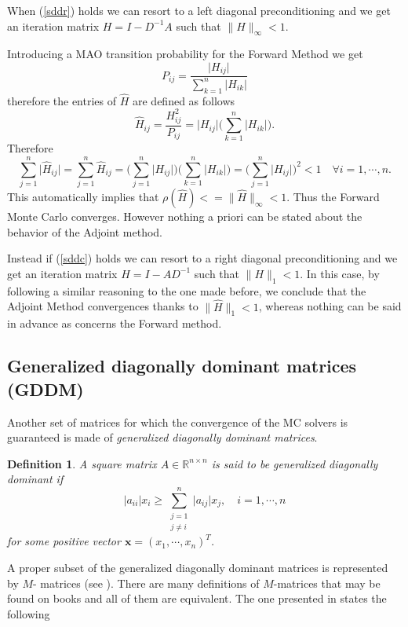 \documentclass[a4paper,10pt]{article}
\newtheorem{defn}{Definition}
\begin{document}
When (\ref{sddr}) holds we can resort to a left diagonal preconditioning and we 
get an iteration matrix $H=I-D^{-1}A$ such that $\lVert H \rVert_{\infty}<1$.

Introducing a MAO transition probability for the Forward Method we get
\[
 P_{ij}=\frac{\lvert H_{ij}\rvert}{\sum_{k=1}^n\lvert H_{ik}\rvert}
\]
therefore the entries of $\hat{H}$ are defined as follows
\[
 \hat{H}_{ij}=\frac{H^2_{ij}}{P_{ij}}=\lvert H_{ij}\rvert\bigg 
(\sum_{k=1}^n\lvert 
H_{ik}\rvert\bigg ).
\]
Therefore
\[
 \sum_{j=1}^n\lvert \hat{H}_{ij} \rvert = \sum_{j=1}^n \hat{H}_{ij} =\bigg 
(\sum_{j=1}^n \lvert H_{ij}\rvert\bigg )\bigg (\sum_{k=1}^n\lvert 
H_{ik}\rvert\bigg ) =\bigg 
(\sum_{j=1}^n \lvert H_{ij}\rvert\bigg ) ^2 <1 \quad \forall i=1,\cdots, n.
\]
This automatically implies that $\rho(\hat{H})<=\lVert 
\hat{H}\rVert_{\infty}<1$. Thus the Forward Monte Carlo converges.
However nothing a priori can be 
stated about the behavior of the Adjoint method.\newline

Instead if (\ref{sddc}) holds we can resort to a right diagonal preconditioning 
and we 
get an iteration matrix $H=I-AD^{-1}$ such that $\lVert H \rVert_{1}<1$.
In this case, by following a similar reasoning to the one made before, we 
conclude that the Adjoint Method convergences thanks to $\lVert 
\hat{H}\rVert_1<1$, 
whereas nothing can be said in advance as concerns the Forward method.


 \subsection{Generalized diagonally dominant matrices (GDDM)}
 
 Another set of matrices for which the convergence of 
the MC solvers is guaranteed is made of \textit{generalized diagonally 
dominant matrices}.

\begin{defn}
A square matrix $A\in\mathbb{R}^{n\times n}$ is said to be generalized 
diagonally dominant if 
\[
 \lvert a_{ii}\rvert x_i \ge \sum_{\substack{j=1\\j\ne i}}^n \lvert 
a_{ij}\rvert 
x_j, \quad i=1,\cdots,n
\]
for some positive vector $\mathbf{x}=(x_1,\cdots,x_n)^T$.
\end{defn}

A proper subset of the generalized diagonally dominant matrices is represented 
by $M$- matrices (see \cite{Ax1996}).
There are many definitions of $M$-matrices that may be found on books and all 
of them are equivalent. The one presented in \cite{Saad} states the 
following
\end{document}
